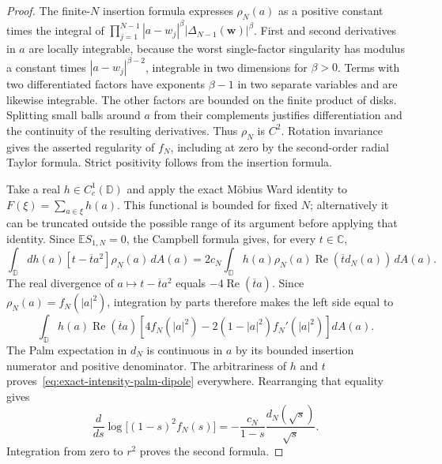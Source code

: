 \documentclass[11pt,a4paper]{article}
\numberwithin{equation}{section}
\theoremstyle{definition}
\theoremstyle{remark}
\newcommand{\D}{\mathbb D}
\newcommand{\E}{\mathbb E}
\newcommand{\C}{\mathbb C}
\begin{document}
\begin{proof}
The finite-$N$ insertion formula expresses $\rho_N(a)$ as a positive
constant times the integral of
$\prod_{j=1}^{N-1}|a-w_j|^\beta|\Delta_{N-1}(\mathbf w)|^\beta$.
First and second derivatives in $a$ are locally integrable, because
the worst single-factor singularity has modulus a constant times
$|a-w_j|^{\beta-2}$, integrable in two dimensions for $\beta>0$.
Terms with two differentiated factors have exponents $\beta-1$ in
two separate variables and are likewise integrable. The other factors
are bounded on the finite product of disks. Splitting small balls
around $a$ from their complements justifies differentiation and the
continuity of the resulting derivatives. Thus $\rho_N$ is $C^2$.
Rotation invariance gives the asserted regularity of $f_N$, including
at zero by the second-order radial Taylor formula. Strict positivity
follows from the insertion formula.

Take a real $h\in C_c^1(\D)$ and apply the exact M\"obius Ward
identity to $F(\xi)=\sum_{a\in\xi}h(a)$. This functional is bounded
for fixed $N$; alternatively it can be truncated outside the possible
range of its argument before applying that identity. Since
$\E S_{1,N}=0$, the Campbell formula gives, for every $t\in\C$,
\[
 \int_\D dh(a)[t-\overline t a^2]\rho_N(a)\,dA(a)
 =2c_N\int_\D h(a)\rho_N(a)
             \operatorname{Re}(\overline t d_N(a))\,dA(a).
\]
The real divergence of $a\mapsto t-\overline t a^2$ equals
$-4\operatorname{Re}(\overline t a)$. Since
$\rho_N(a)=f_N(|a|^2)$, integration by parts therefore makes the
left side equal to
\[
 \int_\D h(a)\operatorname{Re}(\overline t a)
       \left[4f_N(|a|^2)-2(1-|a|^2)f_N'(|a|^2)\right]dA(a).
\]
The Palm expectation in $d_N$ is continuous in $a$ by its bounded
insertion numerator and positive denominator. The arbitrariness of
$h$ and $t$ proves~\eqref{eq:exact-intensity-palm-dipole} everywhere.
Rearranging that equality gives
\[
 \frac{d}{ds}\log\bigl[(1-s)^2 f_N(s)\bigr]
 =-\frac{c_N}{1-s}\frac{d_N(\sqrt{s})}{\sqrt{s}}.
\]
Integration from zero to $r^2$ proves the second formula.
\end{proof}
\end{document}
